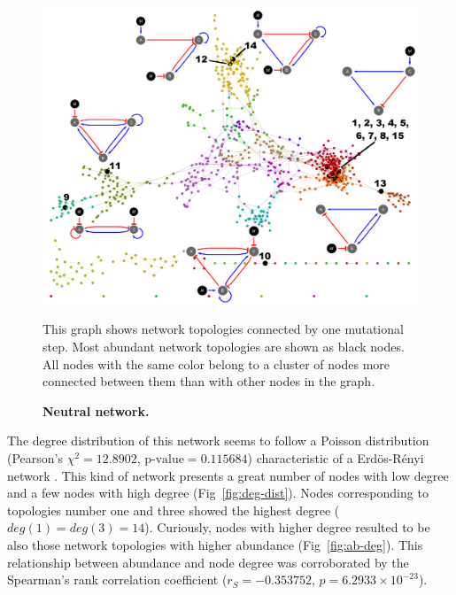 \documentclass[10pt,letterpaper]{article}
\begin{document}
\begin{figure}[!h]
 \includegraphics[width=\textwidth]{figures/results/grafo-hamming-15-nodes-inhibition-bar}
 \caption{\bf Neutral network.}
 This graph shows network topologies connected by one mutational step. Most 
 abundant network topologies are shown as black nodes. All nodes with the same 
 color belong to a cluster of nodes more connected between them than with other 
 nodes in the graph.
 \label{fig:neutral-network}
\end{figure}

The degree distribution of this network seems to follow a Poisson distribution
(Pearson’s $\chi^2 = 12.8902$, $\text{p-value} = 0.115684$) characteristic of a 
Erdös-Rényi network \cite{Erdos1959}. This kind of network presents a great 
number of nodes with low degree and a few nodes with high degree 
(Fig~\ref{fig:deg-dist}). Nodes corresponding to topologies number one and three
showed the highest degree ($deg(1) = deg (3) = 14$). Curiously, nodes with 
higher degree resulted to be also those network topologies with higher abundance
(Fig~\ref{fig:ab-deg}). This relationship between abundance and node degree 
was corroborated by the Spearman's rank correlation coefficient 
($r_S = −0.353752$, $p = 6.2933\times10^{-23} $).
\end{document}
